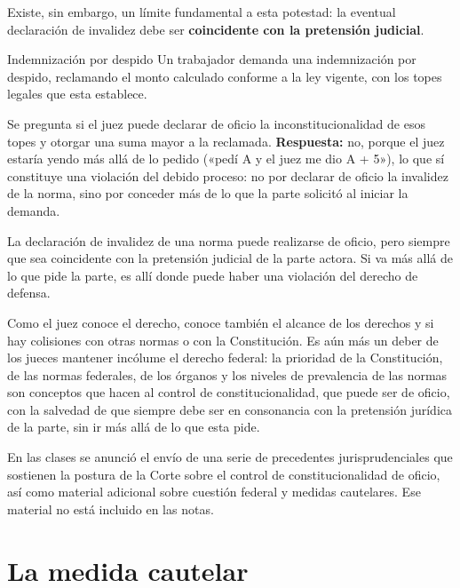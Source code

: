 \documentclass[12pt,oneside]{book}
\begin{document}
Existe, sin embargo, un límite fundamental a esta potestad: la eventual declaración de invalidez debe ser \textbf{coincidente con la pretensión judicial}.

\begin{example}{Indemnización por despido}
Un trabajador demanda una indemnización por despido, reclamando el monto calculado conforme a la ley vigente, con los topes legales que esta establece.

Se pregunta si el juez puede declarar de oficio la inconstitucionalidad de esos topes y otorgar una suma mayor a la reclamada. \textbf{Respuesta:} no, porque el juez estaría yendo más allá de lo pedido («pedí A y el juez me dio A + 5»), lo que sí constituye una violación del debido proceso: no por declarar de oficio la invalidez de la norma, sino por conceder más de lo que la parte solicitó al iniciar la demanda.
\end{example}

\begin{important}
La declaración de invalidez de una norma puede realizarse de oficio, pero siempre que sea coincidente con la pretensión judicial de la parte actora. Si va más allá de lo que pide la parte, es allí donde puede haber una violación del derecho de defensa.
\end{important}

Como el juez conoce el derecho, conoce también el alcance de los derechos y si hay colisiones con otras normas o con la Constitución. Es aún más un deber de los jueces mantener incólume el derecho federal: la prioridad de la Constitución, de las normas federales, de los órganos y los niveles de prevalencia de las normas son conceptos que hacen al control de constitucionalidad, que puede ser de oficio, con la salvedad de que siempre debe ser en consonancia con la pretensión jurídica de la parte, sin ir más allá de lo que esta pide.

\begin{note}
En las clases se anunció el envío de una serie de precedentes jurisprudenciales que sostienen la postura de la Corte sobre el control de constitucionalidad de oficio, así como material adicional sobre cuestión federal y medidas cautelares. Ese material no está incluido en las notas.
\end{note}

\section{La medida cautelar}
\label{sec:cautelar}
\end{document}
